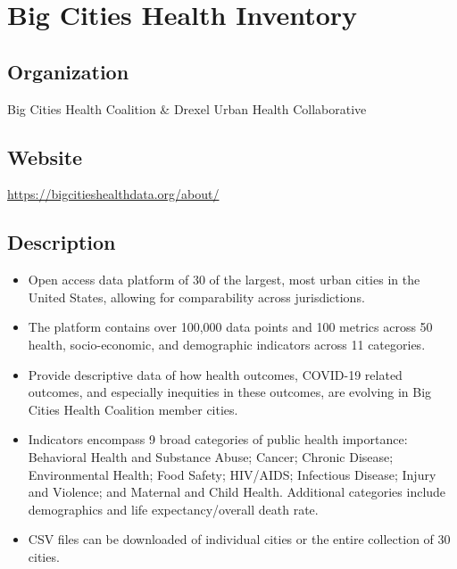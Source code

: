 \documentclass[
]{book}
\providecommand{\tightlist}{%
  \setlength{\itemsep}{0pt}\setlength{\parskip}{0pt}}
\begin{document}
\mainmatter

\hypertarget{big-cities-health-inventory}{%
\chapter{Big Cities Health Inventory}\label{big-cities-health-inventory}}

\hypertarget{organization-12}{%
\section{Organization}\label{organization-12}}

Big Cities Health Coalition \& Drexel Urban Health Collaborative

\hypertarget{website-12}{%
\section{Website}\label{website-12}}

\url{https://bigcitieshealthdata.org/about/}

\hypertarget{description-12}{%
\section{Description}\label{description-12}}

\begin{itemize}
\tightlist
\item
  Open access data platform of 30 of the largest, most urban cities in the United States, allowing for comparability across jurisdictions.
\item
  The platform contains over 100,000 data points and 100 metrics across 50 health, socio-economic, and demographic indicators across 11 categories.
\item
  Provide descriptive data of how health outcomes, COVID-19 related outcomes, and especially inequities in these outcomes, are evolving in Big Cities Health Coalition member cities.
\item
  Indicators encompass 9 broad categories of public health importance: Behavioral Health and Substance Abuse; Cancer; Chronic Disease; Environmental Health; Food Safety; HIV/AIDS; Infectious Disease; Injury and Violence; and Maternal and Child Health. Additional categories include demographics and life expectancy/overall death rate.
\item
  CSV files can be downloaded of individual cities or the entire collection of 30 cities.
\end{itemize}
\end{document}

